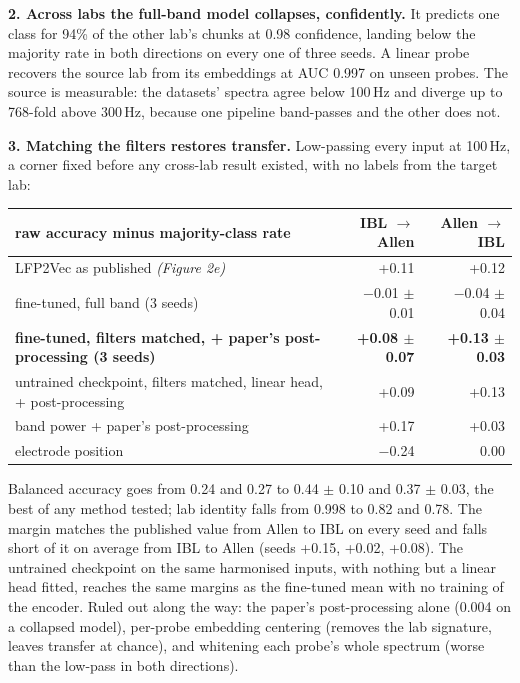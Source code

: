 \documentclass[10pt,a4paper]{article}
\begin{document}
\textbf{2. Across labs the full-band model collapses, confidently.} It predicts one class for 94\%
of the other lab's chunks at 0.98 confidence, landing below the majority rate in both directions
on every one of three seeds.
A linear probe recovers the source lab from its embeddings at AUC 0.997 on unseen probes. The
source is measurable: the datasets' spectra agree below 100\,Hz and diverge up to 768-fold above
300\,Hz, because one pipeline band-passes and the other does not.

\textbf{3. Matching the filters restores transfer.} Low-passing every input at 100\,Hz, a corner
fixed before any cross-lab result existed, with no labels from the target lab:

\begin{table}[h]
\centering\small
\begin{tabular}{lrr}
\toprule
raw accuracy minus majority-class rate & IBL $\to$ Allen & Allen $\to$ IBL \\
\midrule
LFP2Vec as published \textit{(Figure 2e)} & +0.11 & +0.12 \\
fine-tuned, full band (3 seeds) & $-$0.01 $\pm$ 0.01 & $-$0.04 $\pm$ 0.04 \\
\textbf{fine-tuned, filters matched, + paper's post-processing (3 seeds)} & \textbf{+0.08 $\pm$ 0.07} & \textbf{+0.13 $\pm$ 0.03} \\
untrained checkpoint, filters matched, linear head, + post-processing & +0.09 & +0.13 \\
band power + paper's post-processing & +0.17 & +0.03 \\
electrode position & $-$0.24 & 0.00 \\
\bottomrule
\end{tabular}
\end{table}

Balanced accuracy goes from 0.24 and 0.27 to 0.44 $\pm$ 0.10 and 0.37 $\pm$ 0.03, the best of any
method tested; lab identity falls from 0.998 to 0.82 and 0.78. The margin matches the published
value from Allen to IBL on every seed and falls short of it on average from IBL to Allen (seeds
+0.15, +0.02, +0.08). The untrained checkpoint on the same harmonised inputs, with nothing but a
linear head fitted, reaches the same margins as the fine-tuned mean with no training of the
encoder. Ruled out along the way: the
paper's post-processing alone (0.004 on a collapsed model), per-probe embedding centering (removes
the lab signature, leaves transfer at chance), and whitening each probe's whole spectrum (worse
than the low-pass in both directions).
\end{document}
